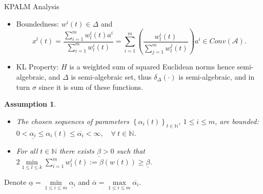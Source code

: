 \documentclass[9pt,handout]{beamer} %
\newtheorem{assumption}{Assumption}
\newcommand{\nn}{\mathbb{N}} %
\begin{document}
	\begin{frame}{KPALM Analysis}
		\begin{itemize}[<+->]
			\item Boundedness: $w^i(t) \in \Delta$ and 
				\begin{equation*}
					x^l(t) = \frac{\sum_{i=1}^{m} w^i_l(t) a^i}{\sum_{i=1}^{m} w^i_l(t)} 
					= \sum_{i=1}^{m} \left( \frac{ w^i_l(t)}{\sum_{j=1}^{m} w^j_l(t)} \right) a^i \in Conv(\mathcal{A}).
				\end{equation*}
			\item KL Property: $H$ is a weighted sum of squared Euclidean norms hence semi-algebraic, and $\Delta$ is semi-algebraic set, thus $\delta_{\Delta}(\cdot)$ is semi-algebraic, and in turn $\sigma$ since it is sum of these functions.
		\end{itemize}
		\pause
		\begin{assumption} \label{AssumptionsB}
            \begin{itemize}
                \item[$\rm{(i)}$] The chosen sequences of parameters $\left\{ \alpha_i(t) \right\}_{t \in \nn}$, $1 \leq i \leq m$, are bounded: $0 < \underline{\alpha_i} \leq \alpha_i(t) \leq \overline{\alpha_i} < \infty, \quad \forall \: t \in \nn$.
                \item[$\rm{(ii)}$] For all $t \in \mathbb{N}$ there exists $\underline{\beta} > 0$ such that $2\min\limits_{1 \leq l \leq k} \sum\limits_{i=1}^{m} w^i_l(t) := \beta(w(t)) \geq \underline{\beta}$.
            \end{itemize}
        \end{assumption}
        \pause
        Denote $\underline{\alpha}=\min\limits_{1 \leq i \leq m} \underline{\alpha_i}$ and $\overline{\alpha}=\max\limits_{1 \leq i \leq m} \overline{\alpha_i}$.
	\end{frame}
	
\end{document}
